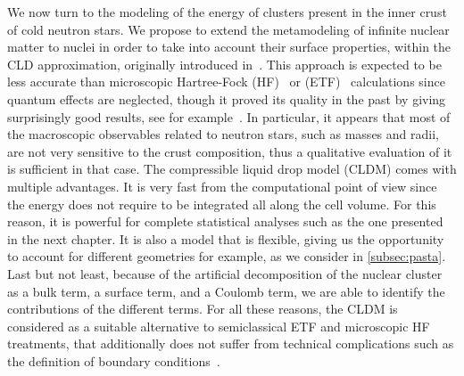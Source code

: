 We now turn to the modeling of the energy of clusters present in the inner crust
of cold neutron stars. We propose to extend the metamodeling of infinite nuclear 
matter to nuclei in order to take into account their surface properties, within 
the CLD approximation, originally
introduced in~\cite{BBP}. This approach is 
expected to be less accurate than microscopic Hartree-Fock
(HF)~\cite{Negele1973} or (ETF)~\cite{Onsi2008} 
calculations since quantum effects are neglected, 
though it proved its quality in the past by giving surprisingly good
results, see for example~\cite{BBP,Lattimer1991,Douchin2000a,Douchin2001}. 
In particular, it
appears that most of the macroscopic observables related to neutron stars, such 
as masses and radii, are not very sensitive to the crust composition, thus a 
qualitative evaluation of it is sufficient in that case.
The compressible liquid drop model (CLDM) comes with multiple advantages. It is
very fast from the computational point of view since the energy does not require
to be integrated all along the cell volume.
For this reason, it is powerful for complete statistical analyses such as the one 
presented in the next chapter. It is also a model that is {flexible}, giving 
us the opportunity to account for different geometries for example, as we 
consider in \ref{subsec:pasta}. Last but not 
least, because of the artificial decomposition of the nuclear cluster as a 
bulk term, a surface term, and a Coulomb term, we are able to identify the
contributions of the different terms. For all these reasons, the CLDM is
considered as a suitable alternative to semiclassical ETF and microscopic 
HF treatments, that additionally does not suffer from technical
complications such as the definition of boundary conditions~\cite{Newton2009}.

